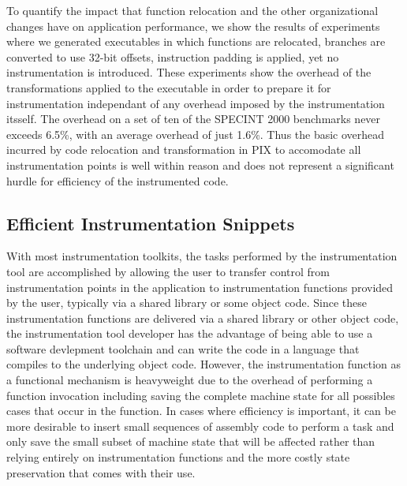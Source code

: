 To quantify the impact that function relocation and the other organizational changes have
on application performance, we show the results of experiments
where we generated executables in which functions are relocated, branches are converted to use 32-bit offsets, 
instruction padding is applied, yet no instrumentation is introduced. 
These experiments show the overhead of the transformations applied to the executable 
in order to prepare it for instrumentation independant of any overhead imposed by the 
instrumentation itsself. The overhead on a set of ten of the 
SPECINT 2000 benchmarks never exceeds 6.5\%, with an average
overhead of just 1.6\%. Thus the basic overhead incurred by code relocation and transformation in PIX to accomodate all instrumentation points is
well within reason and does not represent a significant hurdle for efficiency of the instrumented code.

\subsection{Efficient Instrumentation Snippets}

With most instrumentation toolkits, the tasks performed by the instrumentation tool are accomplished by allowing the user
to transfer control from instrumentation points in the application to instrumentation functions provided by the user, typically
via a shared library or some object code. Since these instrumentation functions are delivered via a shared library or other
object code, the instrumentation tool developer has the advantage of being able to use a software devlepment toolchain and can
write the code in a language that compiles to the underlying object code. However, 
the instrumentation function as a functional mechanism is heavyweight due to 
the overhead of performing a function invocation including saving 
the complete machine state for all possibles cases that occur in the function. In cases where
efficiency is important, it can be more desirable to insert small sequences of assembly code to perform a task and only
save the small subset of machine state that will be affected rather than relying entirely on instrumentation functions and the
more costly state preservation that comes with their use.

